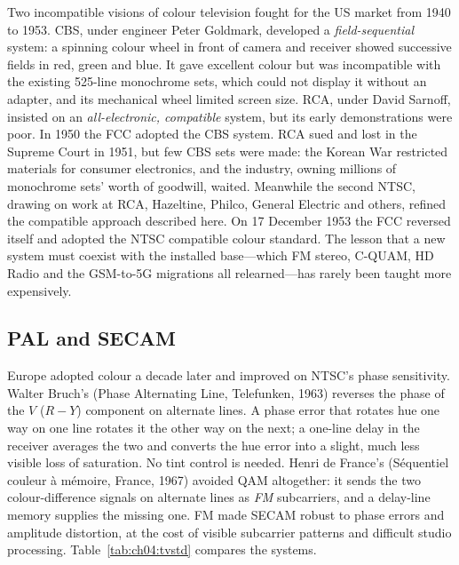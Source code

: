 \begin{history}
Two incompatible visions of colour television fought for the US market from 1940 to 1953. CBS, under engineer
Peter Goldmark, developed a \emph{field-sequential} system: a spinning colour wheel in front of camera and
receiver showed successive fields in red, green and blue. It gave excellent colour but was incompatible with
the existing 525-line monochrome sets, which could not display it without an adapter, and its mechanical wheel
limited screen size. RCA, under David Sarnoff, insisted on an \emph{all-electronic, compatible} system, but its
early demonstrations were poor. In 1950 the FCC adopted the CBS system. RCA sued and lost in the Supreme Court
in 1951, but few CBS sets were made: the Korean War restricted materials for consumer electronics, and the
industry, owning millions of monochrome sets' worth of goodwill, waited. Meanwhile the second NTSC, drawing on
work at RCA, Hazeltine, Philco, General Electric and others, refined the compatible approach described here.
On 17 December 1953 the FCC reversed itself and adopted the NTSC compatible colour standard. The lesson that a
new system must coexist with the installed base---which FM stereo, C-QUAM, HD Radio and the GSM-to-5G
migrations all relearned---has rarely been taught more expensively.
\end{history}

\subsection{PAL and SECAM}

Europe adopted colour a decade later and improved on NTSC's phase sensitivity. Walter Bruch's 
(Phase Alternating Line, Telefunken, 1963) reverses the phase of the $V$ ($R-Y$) component on alternate lines.
A phase error that rotates hue one way on one line rotates it the other way on the next; a one-line delay in
the receiver averages the two and converts the hue error into a slight, much less visible loss of saturation.
No tint control is needed. Henri de France's  (Séquentiel couleur à mémoire, France, 1967) avoided
QAM altogether: it sends the two colour-difference signals on alternate lines as \emph{FM} subcarriers, and a
delay-line memory supplies the missing one. FM made SECAM robust to phase errors and amplitude distortion, at
the cost of visible subcarrier patterns and difficult studio processing. Table~\ref{tab:ch04:tvstd} compares the
systems.

